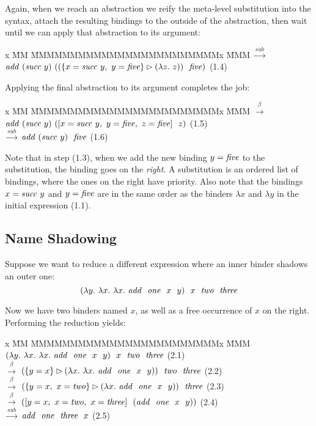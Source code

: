 Again, when we reach an abstraction we reify the meta-level substitution into the syntax, attach the resulting bindings to the outside of the abstraction, then wait until we can apply that abstraction to its argument: 
%
\begin{tabbing}
x \= MM \= MMMMMMMMMMMMMMMMMMMMMMMMx \= MMM \kill
        \> $\stackrel{sub}{\longrightarrow}$
        \> $\mathit{add}~ (\mathit{succ}~ y)~ ((\{x = \mathit{succ}~ y,~ y = \mathit{five}\} 
                \rhd (\lambda z.~ z))~~ \mathit{five})$
        \> (1.4)
\end{tabbing}

Applying the final abstraction to its argument completes the job: 
%
\begin{tabbing}
x \= MM \= MMMMMMMMMMMMMMMMMMMMMMMMx \= MMM \kill
        \> $\stackrel{\beta}{\longrightarrow}$
        \> $\mathit{add}~ (\mathit{succ}~ y)~ 
                ([x = \mathit{succ}~ y,~ y = \mathit{five},~ z = \mathit{five}]~~ z)$
        \> (1.5)
\\
        \> $\stackrel{sub}{\longrightarrow}$
        \> $\mathit{add}~ (\mathit{succ}~ y)~~ \mathit{five}$
        \> (1.6)
\end{tabbing}

Note that in step (1.3), when we add the new binding $y = \mathit{five}$ to the substitution, the binding goes on the \emph{right}. A substitution is an ordered list of bindings, where the ones on the right have priority. Also note that the bindings $x = \mathit{succ}~ y$ and $y = \mathit{five}$ are in the same order as the binders $\lambda x$ and $\lambda y$ in the initial expression (1.1). 


\subsection{Name Shadowing}
Suppose we want to reduce a different expression where an inner binder shadows an outer one:
%
$$
(\lambda y.~ \lambda x.~ \lambda x.~ \mathit{add}~~ \mathit{one}~~ x~~ y)~~ 
                x~~ \mathit{two}~~ \mathit{three}
$$

Now we have two binders named $x$, as well as a free occurrence of $x$ on the right. Performing the reduction yields:
%
\begin{tabbing}
x \= MM \= MMMMMMMMMMMMMMMMMMMMMMMMx \= MMM \kill
        \>
        \> $(\lambda y.~ \lambda x.~ \lambda x.~ \mathit{add}~~ \mathit{one}~~ x~~ y)~~ 
                x~~ \mathit{two}~~ \mathit{three}$
        \> (2.1)  
\\
        \> $\stackrel{\beta}{\longrightarrow}$
        \> $(\{y = x\}
                \rhd (\lambda x.~ \lambda x.~ \mathit{add}~~ \mathit{one}~~ x~~ y))~~ 
                        \mathit{two}~~ \mathit{three}$
        \> (2.2)
\\
        \> $\stackrel{\beta}{\longrightarrow}$
        \> $(\{y = x,~ x = \mathit{two}\}
                \rhd (\lambda x.~ \mathit{add}~~ \mathit{one}~~ x~~ y))~~ \mathit{three}$
        \> (2.3)
\\
        \> $\stackrel{\beta}{\longrightarrow}$
        \> $([y = x,~ x = \mathit{two},~ x = \mathit{three}]~~
                (\mathit{add}~~ \mathit{one}~~ x~~ y))$
        \> (2.4)
\\      
        \> $\stackrel{sub}{\longrightarrow}$
        \> $\mathit{add}~~ \mathit{one}~~ \mathit{three}~~ x$
        \> (2.5)
\end{tabbing}

